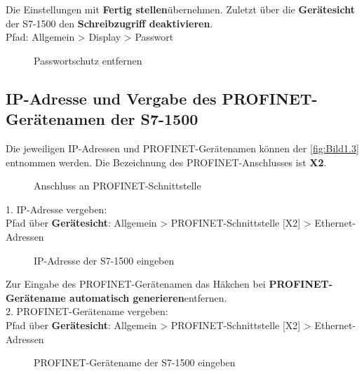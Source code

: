 Die Einstellungen mit \glqq\textbf{Fertig stellen}\grqq\:übernehmen. Zuletzt über die \textbf{Gerätesicht} der S7-1500 den \textbf{Schreibzugriff deaktivieren}.\\
Pfad: Allgemein > Display > Passwort 
\begin{figure}[H]
   \centering
   \caption[Passwortschutz entfernen]{Passwortschutz entfernen}
   \label{fig:Bild3.8}
\end{figure}

\clearpage

\subsection{IP-Adresse und Vergabe des PROFINET-Gerätenamen der S7-1500} \label{sec: IP-Adresse_PROFINET-Gerätename_S7-1500}
Die jeweiligen IP-Adressen und PROFINET-Gerätenamen können der \autoref{fig:Bild1.3} entnommen werden. Die Bezeichnung des PROFINET-Anschlusses ist \textbf{X2}.

\begin{figure}[H]
   \centering
   \caption[Anschluss an PROFINET-Schnittstelle]{Anschluss an PROFINET-Schnittstelle}
   \label{fig:Bild3.9}
\end{figure}

1. IP-Adresse vergeben:\\
Pfad über \textbf{Gerätesicht}: Allgemein > PROFINET-Schnittstelle [X2] > Ethernet-Adressen
\begin{figure}[H]
   \centering
   \caption[IP-Adresse der S7-1500 eingeben]{IP-Adresse der S7-1500 eingeben}
   \label{fig:Bild3.10}
\end{figure}

Zur Eingabe des PROFINET-Gerätenamen das Häkchen bei \glqq\textbf{PROFINET-Gerätename automatisch generieren}\grqq\:entfernen.\\
2. PROFINET-Gerätename vergeben:\\
Pfad über \textbf{Gerätesicht}: Allgemein > PROFINET-Schnittstelle [X2] > Ethernet-Adressen
\begin{figure}[H]
   \centering
   \caption[PROFINET-Gerätename der S7-1500 eingeben]{PROFINET-Gerätename der S7-1500 eingeben}
   \label{fig:Bild3.11}
\end{figure}